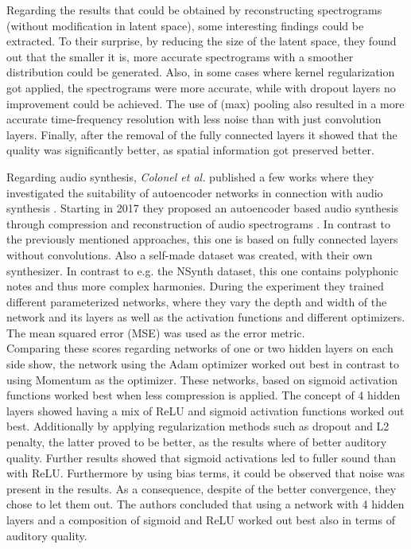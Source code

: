 Regarding the results that could be obtained by reconstructing spectrograms (without modification in latent space), some interesting findings could be extracted. To their surprise, by reducing the size of the latent space, they found out that the smaller it is, more accurate spectrograms with a smoother distribution could be generated. Also, in some cases where kernel regularization got applied, the spectrograms were more accurate, while with dropout layers no improvement could be achieved. The use of (max) pooling also resulted in a more accurate time-frequency resolution with less noise than with just convolution layers. Finally, after the removal of the fully connected  layers it showed that the quality was significantly better, as spatial information got preserved better.

Regarding audio synthesis, \textit{Colonel et al.} published a few works where they investigated the suitability of autoencoder networks in connection with audio synthesis \cite{colonel2017improving, colonel2018autoencoding, Colonel2020}. Starting in 2017 they proposed an autoencoder based audio synthesis through compression and reconstruction of audio spectrograms \cite{colonel2017improving}. In contrast to the previously mentioned approaches, this one is based on fully connected layers without convolutions. Also a self-made dataset was created, with their own synthesizer. In contrast to e.g. the NSynth dataset, this one contains polyphonic notes and thus more complex harmonies. During the experiment they trained different parameterized networks, where they vary the depth and width of the network and its layers as well as the activation functions and different optimizers. The mean squared error (MSE) was used as the error metric.\\
Comparing these scores regarding networks of one or two hidden layers on each side show, the network using the Adam optimizer worked out best in contrast to using Momentum as the optimizer. These networks, based on sigmoid activation functions worked best when less compression is applied. The concept of 4 hidden layers showed having a mix of ReLU and sigmoid activation functions worked out best. Additionally by applying regularization methods such as dropout and L2 penalty, the latter proved to be better, as the results where of better auditory quality. Further results showed that sigmoid activations led to fuller sound than with ReLU. Furthermore by using bias terms, it could be observed that noise was present in the results. As a consequence, despite of the better convergence, they chose to let them out. The authors concluded  that using a network with 4 hidden layers and a composition of sigmoid and ReLU worked out best also in terms of auditory quality.

